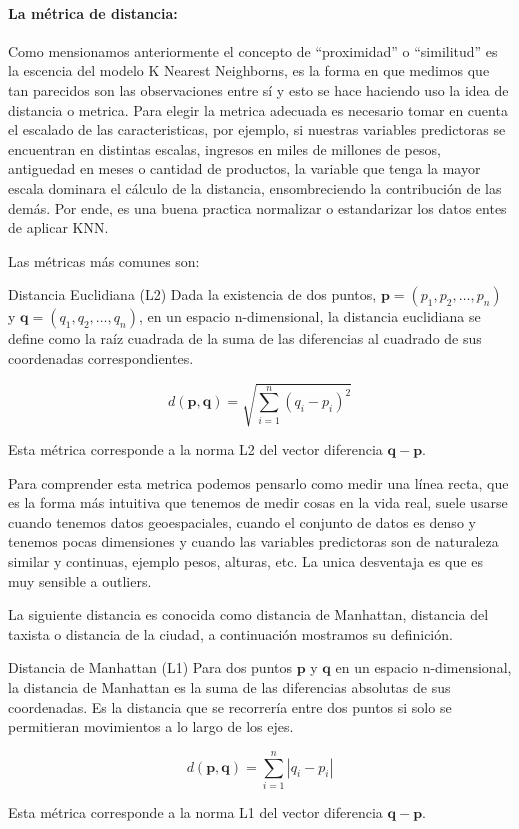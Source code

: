 \paragraph{La métrica de distancia:} Como mensionamos anteriormente el concepto de ``proximidad'' o ``similitud'' es la escencia del modelo K Nearest Neighborns, es la forma en que medimos que tan parecidos son las observaciones entre sí y esto se hace haciendo uso la idea de distancia o metrica. Para elegir la metrica adecuada es necesario tomar en cuenta el escalado de las caracteristicas, por ejemplo, si nuestras variables predictoras se encuentran en distintas escalas, ingresos en miles de millones de pesos, antiguedad en meses o cantidad de productos, la variable que tenga la mayor escala dominara el cálculo de la distancia, ensombreciendo la contribución de las demás. Por ende, es una buena practica normalizar o estandarizar los datos entes de aplicar KNN.

Las métricas más comunes son:

\begin{definicion}{Distancia Euclidiana (L2)}
	Dada la existencia de dos puntos, $\mathbf{p} = (p_1, p_2, \dots, p_n)$ y $\mathbf{q} = (q_1, q_2, \dots, q_n)$, en un espacio n-dimensional, la distancia euclidiana se define como la raíz cuadrada de la suma de las diferencias al cuadrado de sus coordenadas correspondientes.
	
	\[
	d(\mathbf{p}, \mathbf{q}) = \sqrt{\sum_{i=1}^{n}(q_i - p_i)^2}
	\]
	
	Esta métrica corresponde a la norma L2 del vector diferencia $\mathbf{q} - \mathbf{p}$.
\end{definicion}

Para comprender esta metrica podemos pensarlo como medir una línea recta, que es la forma más intuitiva que tenemos de medir cosas en la vida real, suele usarse cuando tenemos datos geoespaciales, cuando el conjunto de datos es denso y tenemos pocas dimensiones y cuando las variables predictoras son de naturaleza similar y continuas, ejemplo pesos, alturas, etc. La unica desventaja es que es muy sensible a outliers.

La siguiente distancia es conocida como distancia de Manhattan, distancia del taxista o distancia de la ciudad, a continuación mostramos su definición. 

\begin{definicion}{Distancia de Manhattan (L1)}
	Para dos puntos $\mathbf{p}$ y $\mathbf{q}$ en un espacio n-dimensional, la distancia de Manhattan es la suma de las diferencias absolutas de sus coordenadas. Es la distancia que se recorrería entre dos puntos si solo se permitieran movimientos a lo largo de los ejes.
	
	\[
	d(\mathbf{p}, \mathbf{q}) = \sum_{i=1}^{n}|q_i - p_i|
	\]
	
	Esta métrica corresponde a la norma L1 del vector diferencia $\mathbf{q} - \mathbf{p}$.
\end{definicion}

